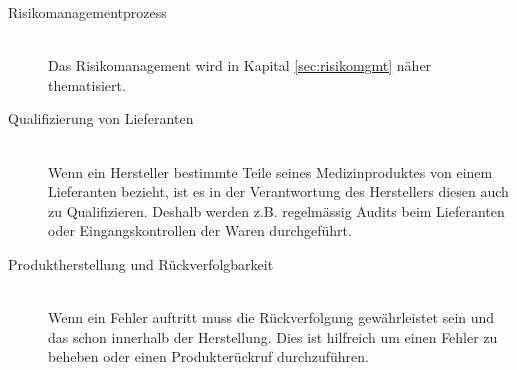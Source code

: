 \begin{description}
	\item[Risikomanagementprozess] \hfil \\
	Das Risikomanagement wird in Kapital \ref{sec:risikomgmt} näher thematisiert.
	
	\item[Qualifizierung von Lieferanten] \hfil \\
	Wenn ein Hersteller bestimmte Teile seines Medizinproduktes von einem Lieferanten bezieht, ist es in der Verantwortung des Herstellers diesen auch zu Qualifizieren. Deshalb werden z.B. regelmässig Audits beim Lieferanten oder Eingangskontrollen der Waren durchgeführt.
	
	\item[Produktherstellung und Rückverfolgbarkeit] \hfil \\
	Wenn ein Fehler auftritt muss die Rückverfolgung gewährleistet sein und das schon innerhalb der Herstellung. Dies ist hilfreich um einen Fehler zu beheben oder einen Produkterückruf durchzuführen.
\end{description}
